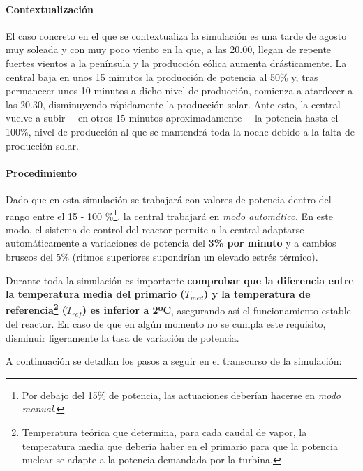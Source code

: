 \paragraph{Contextualización}

El caso concreto en el que se contextualiza la simulación es una tarde de agosto muy soleada y con muy poco viento en la que, a las 20.00, llegan de repente fuertes vientos a la península y la producción eólica aumenta drásticamente. La central baja en unos 15 minutos la producción de potencia al 50\% y, tras permanecer unos 10 minutos a dicho nivel de producción, comienza a atardecer a las 20.30, disminuyendo rápidamente la producción solar. Ante esto, la central vuelve a subir ---en otros 15 minutos aproximadamente--- la potencia hasta el 100\%, nivel de producción al que se mantendrá toda la noche debido a la falta de producción solar.

\paragraph{Procedimiento} \label{procedimiento}

Dado que en esta simulación se trabajará con valores de potencia dentro del rango entre el 15 - 100 \%\footnote{Por debajo del 15\% de potencia, las actuaciones deberían hacerse en \textit{modo manual}.}, la central trabajará en \textit{modo automático}. En este modo, el sistema de control del reactor permite a la central adaptarse automáticamente a variaciones de potencia del \textbf{3\% por minuto} y a cambios bruscos del 5\% (ritmos superiores supondrían un elevado estrés térmico). 

Durante toda la simulación es importante \textbf{comprobar que la diferencia entre la temperatura media del primario ($T_{med}$) y la temperatura de referencia\footnote{Temperatura teórica que determina, para cada caudal de vapor, la temperatura media que debería haber en el primario para que la potencia nuclear se adapte a la potencia demandada por la turbina.} ($T_{ref}$) es inferior a 2ºC}, asegurando así el funcionamiento estable del reactor. En caso de que en algún momento no se cumpla este requisito, disminuir ligeramente la tasa de variación de potencia.

A continuación se detallan los pasos a seguir en el transcurso de la simulación:

